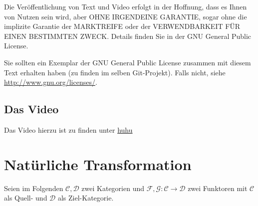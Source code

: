 \documentclass[a4paper]{amsart}
\theoremstyle{definition}
\begin{document}
Die Veröffentlichung von Text und Video erfolgt in der Hoffnung, dass es Ihnen von Nutzen sein wird, 
aber OHNE IRGENDEINE GARANTIE, sogar ohne die implizite Garantie der MARKTREIFE oder der 
VERWENDBARKEIT FÜR EINEN BESTIMMTEN ZWECK. Details finden Sie in der GNU General Public License.

Sie sollten ein Exemplar der GNU General Public License zusammen mit diesem Text erhalten haben 
(zu finden im selben Git-Projekt). 
Falls nicht, siehe \url{http://www.gnu.org/licenses/}.

\subsection*{Das Video}
Das Video hierzu ist zu finden unter 
{\tiny
   \url{huhu}
}

\section{Natürliche Transformation}
Seien im Folgenden $\mathcal{C,D}$ zwei Kategorien und $\mathcal F,\mathcal G \colon \mathcal C \to \mathcal D$ zwei Funktoren mit $\mathcal C$ als Quell- und $\mathcal D$ als Ziel-Kategorie.

\end{document}
